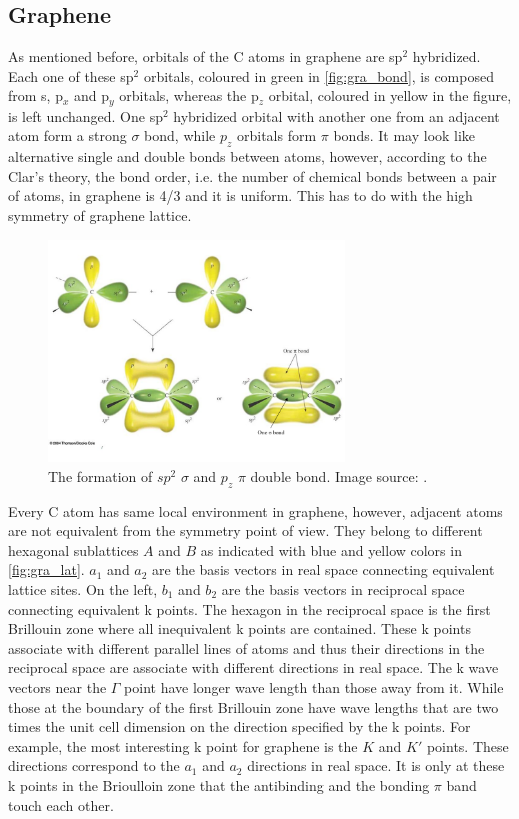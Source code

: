 \subsection{Graphene}

As mentioned before, orbitals of the C atoms in graphene are sp$^2$ hybridized. Each one of these sp$^2$ orbitals, coloured in green in \autoref{fig:gra_bond}, is composed from s, p$_x$ and p$_y$ orbitals, whereas the p$_z$ orbital, coloured in yellow in the figure, is left unchanged. One sp$^2$ hybridized orbital with another one from an adjacent atom form a strong $\sigma$ bond, while $p_z$ orbitals form $\pi$ bonds. It may look like alternative single and double bonds between atoms, however, according to the Clar's theory, the bond order, i.e. the number of chemical bonds between a pair of atoms, in graphene is 4/3 and it is uniform\cite{Wassmann2010}. This has to do with the high symmetry of graphene lattice.

\begin{figure}[htbp!] 
\centering  
\includegraphics[width=0.7\textwidth]{double_bond}
\caption{The formation of $sp^2$ $\sigma$ and $p_z$ $\pi$ double bond. Image source: \cite{gra_bond}. }  
\label{fig:gra_bond}
\end{figure} 

Every C atom has same local environment in graphene, however, adjacent atoms are not equivalent from the symmetry point of view. They belong to different hexagonal sublattices $A$ and $B$ as indicated with blue and yellow colors in \autoref{fig:gra_lat}. $a_1$ and $a_2$ are the basis vectors in real space connecting equivalent lattice sites. On the left, $b_1$ and $b_2$ are the basis vectors in reciprocal space connecting equivalent k points. The hexagon in the reciprocal space is the first Brillouin zone where all inequivalent k points are contained. These k points associate with different parallel lines of atoms and thus their directions in the reciprocal space are associate with different directions in real space. The k wave vectors near the $\Gamma$ point have longer wave length than those away from it. While those at the boundary of the first Brillouin zone have wave lengths that are two times the unit cell dimension on the direction specified by the k points. For example, the most interesting k point for graphene is the $K$ and $K'$ points. These directions correspond to the $a_1$ and $a_2$ directions in real space. It is only at these k points in the Brioulloin zone that the antibinding and the bonding $\pi$ band touch each other.  

